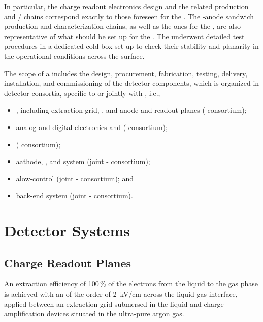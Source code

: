 In particular, the charge readout electronics design and the related production and / chains correspond exactly to those foreseen for the . The -anode sandwich production and characterization chains, as well as the ones for the  ,  are also representative of what should be set up for the . The  underwent detailed test procedures in a dedicated cold-box set up to check their  stability and planarity in the operational conditions across the  surface.

The scope of a  includes the design, procurement, fabrication, testing, delivery, installation, and commissioning of the detector components, which is organized in detector consortia, specific to  or jointly with , i.e., 

\begin{itemize}
\item {}, including extraction grid, , and anode and readout planes ( consortium);
\item analog and digital electronics and  ( consortium); 
\item {} ( consortium);
\item aathode, , and  system (joint - consortium);  
\item alow-control (joint - consortium); and
\item back-end  system (joint - consortium).
\end{itemize}


\section{Detector Systems}
\label{sec:dp-execsum-systems}

\subsection{Charge Readout Planes}
\label{sec:dp-execsum-crp}

An extraction efficiency of \num{100}\,\% of the electrons from the liquid to the gas phase is achieved with an \efield of the order of \SI{2}{kV/cm} across the liquid-gas interface, applied between an  extraction grid submersed in the liquid and charge amplification  devices situated in the ultra-pure argon gas. 

